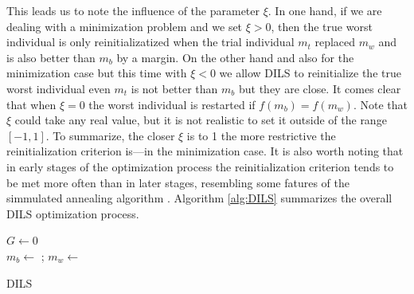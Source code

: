 \documentclass[review]{elsarticle}
\begin{document}
This leads us to note the influence of the parameter $\xi$. In one hand, if we are dealing with a minimization problem and we set $\xi > 0$, then the true worst individual is only reinitializatized when the trial individual $m_t$ replaced $m_w$ and is also better than $m_b$ by a margin. On the other hand and also for the minimization case but this time with $\xi < 0$ we allow DILS to reinitialize the true worst individual even $m_t$ is not better than $m_b$ but they are close. It comes clear that when $\xi = 0$ the worst individual is restarted if $f(m_b) = f(m_w)$. Note that $\xi$ could take any real value, but it is not realistic to set it outside of the range $[-1,1]$. To summarize, the closer $\xi$ is to 1 the more restrictive the reinitialization criterion is---in the minimization case. It is also worth noting that in early stages of the optimization process the reinitialization criterion tends to be met more often than in later stages, resembling some fatures of the simmulated annealing algorithm \cite{van1987simulated}. Algorithm \ref{alg:DILS} summarizes the overall DILS optimization process.

\begin{algorithm}
	\SetNlSkip{0.5em}
	\KwIn{}
	$G \leftarrow 0$\\
	$m_b \leftarrow$ \RandInit{};
	$m_w \leftarrow$ \RandInit{}\\
\caption{DILS}\label{alg:DILS}
\end{algorithm}
\end{document}
